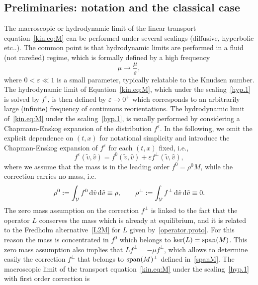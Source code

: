 \documentclass[a4paper]{article}
\theoremstyle{Theorem}\newtheorem{proposition}{Proposition}[section]
\theoremstyle{Remark}\newtheorem{remark}{Remark}[section]
\theoremstyle{Theorem}\newtheorem{theorem}{Theorem}[section]
\newcommand{\hv}{\hat{v}}
\newcommand{\tv}{\tilde{v}}
\newcommand{\intV}{\int_{\mathcal{V}}}
\begin{document}
\subsection{Preliminaries: notation and the classical case}
The macroscopic or hydrodynamic limit of the linear transport equation~\eqref{kin.eq:M} can be performed under several scalings (diffusive, hyperbolic etc..). The common point is that hydrodynamic  limits are performed in a fluid (not rarefied) regime, which  is formally defined by a high frequency
\begin{equation}\label{hyp.1}
    \mu \rightarrow \dfrac{\mu}{\varepsilon},
\end{equation}
where $0<\varepsilon \ll 1$ is a small parameter, typically relatable to the Knudsen number. The hydrodynamic limit of Equation~\eqref{kin.eq:M}, which under the scaling~\eqref{hyp.1} is solved by $f^\varepsilon$, is then defined by $\varepsilon \to 0^+$ which corresponds to an arbitrarily large (infinite) frequency of continuous reorientations.  The hydrodynamic limit of~\eqref{kin.eq:M} under the scaling~\eqref{hyp.1}, is usually performed by considering a Chapmann-Enskog expansion of the distribution $f^\varepsilon$. In the following, we omit the explicit dependence on $(t,x)$ for notational simplicity and introduce the Chapman-Enskog expansion of $f^\varepsilon$ for each $(t,x)$ fixed, i.e.,
\begin{equation}\label{def:Ch.E.}
    f^\varepsilon(\tv,\hv) =f^0(\tv,\hv) + \varepsilon f^{\bot}(\tv,\hv),
\end{equation}
where we assume that the mass is in the leading order $f^0=\rho^0M$, while the correction carries no mass, i.e.
\begin{equation*}
    \rho^0 := \intV f^0 \, {\rm d} \hv \, {\rm d} \tv \equiv \rho, \qquad \rho^{\bot} := \intV f^{\bot} \, {\rm d} \hv \, {\rm d} \tv  \equiv 0.
\end{equation*}
The zero mass assumption on the correction $f^\bot$ is linked to the fact that the operator $L$ conserves the mass which is already at equilibrium, and it is related to the Fredholm alternative~\eqref{L2M} for $L$ given by~\eqref{operator.proto}. For this reason the mass is concentrated in $f^0$ which belongs to $\ker(L)={\rm span}(M)$. This zero mass assumption also implies that ${Lf^\bot=-\mu f^\bot}$, which allows to determine easily the correction $f^\bot$ that belongs to ${\rm span}(M)^\bot$ defined in~\eqref{spanM}.
The macroscopic limit of the transport equation~\eqref{kin.eq:M} under the scaling~\eqref{hyp.1} with first order correction is  
\end{document}
